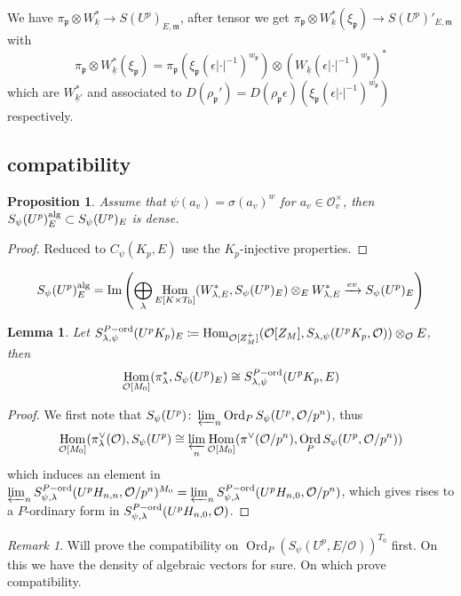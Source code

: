 \documentclass[leqno]{amsart}
\newcommand{\wt}[1]{\underline{ #1 }}
\DeclareMathOperator{\Ord}{Ord}
\newcommand{\alg}{\textnormal{alg}}
\newcommand{\ord}{\textnormal{ord}}
\newcommand{\oo}{\mathcal{O}} %
\newcommand{\fm}{\mathfrak{m}}
\newcommand{\fp}{\mathfrak{p}}
\DeclareMathOperator{\Hom}{Hom}
\DeclareMathOperator{\Image}{Im}
\newtheorem{lem}[thm]{Lemma}
\newtheorem{prop}[thm]{Proposition}
\theoremstyle{definition}
\theoremstyle{remark}
\newtheorem{rem}[thm]{Remark}
\begin{document}
We have  $\pi_\fp\otimes W_{\wt{k}}^*\to S(U^p)_{E,\fm}$,
after tensor we get 
$\pi_\fp\otimes W_{\wt{k}}^*(\xi_\fp)\to S(U^p)'_{E,\fm}$
with 
\[
	\pi_\fp\otimes W_{\wt{k}}^*(\xi_\fp)=
	\pi_\fp(\xi_\fp(\epsilon|\cdot|^{-1})^{w_\fp})
	\otimes
	(W_{\wt{k}}(\epsilon|\cdot|^{-1})^{w_{\fp}})^*
\]
which are $W_{\wt{k}'}^*$ 
and associated to 
$D(\rho_\fp')=
D(\rho_\fp\epsilon)(\xi_\fp(\epsilon|\cdot|^{-1})^{w_\fp})$
respectively.

\subsection{compatibility}

\begin{prop}
Assume that $\psi(a_v)=\sigma(a_v)^w$
for  $a_v\in \oo_v^\times$,
then $S_\psi(U^p)_E^{\alg}\subset S_\psi(U^p)_E$
is dense.
\end{prop}
\begin{proof}
	Reduced to $C_\psi(K_p,E)$ use the  $K_p$-injective properties.
\end{proof}
\[
S_\psi(U^p)_E^{\alg}=
\Image\left(
	\bigoplus_{\lambda}\Hom_{E[K\times T_0]}(W_{\lambda,E}^*, 
	S_\psi(U^p)_E)
	\otimes_EW_{\lambda,E}^*\xrightarrow{ev}
	S_\psi(U^p)_E
\right)
\]

\begin{lem}
	Let $S_{\lambda,\psi}^{P-\ord}(U^pK_p)_E
	\coloneqq \Hom_{\oo[Z_M^+]}
	(\oo[Z_M], S_{\lambda,\psi}(U^pK_p,\oo))\otimes_\oo E$,
	then
	\[
		\Hom_{\oo[M_0]}(\pi_\lambda^*, S_\psi(U^p)_E)\cong
		S_{\lambda,\psi}^{P-\ord}(U^pK_p,E)
	\]
\end{lem}
\begin{proof}
	We first note that 
	$S_\psi(U^p)\colon \varprojlim_{n}\Ord_PS_\psi(U^p, \oo/p^n)$,
	thus 
	\[
		\Hom_{\oo[M_0]}(\pi_\lambda^\vee(\oo),S_\psi(U^p)\cong
		\varprojlim_{n}\Hom_{\oo[M_0]}(\pi^\vee(\oo/p^n),
		\Ord_PS_\psi(U^p,\oo/p^n))
	\]
	which induces an element in 
	$\varprojlim_n S_{\psi,\lambda}^{P-\ord}(U^pH_{n,n},\oo/p^n)^{M_0}
	=\varprojlim_n S_{\psi,\lambda}^{P-\ord}(U^pH_{n,0},\oo/p^n)$,
	which gives rises to a $P$-ordinary form in 
	$S_{\psi,\lambda}^{P-\ord}(U^pH_{n,0},\oo)$.
\end{proof}


\begin{rem}
	Will prove the compatibility on 
	$\Ord_P(S_\psi(U^p,E/\oo))^{T_0}$ first.
	On this we have the density of 
	algebraic vectors for sure.
	On which prove compatibility. 
\end{rem}
\end{document}
